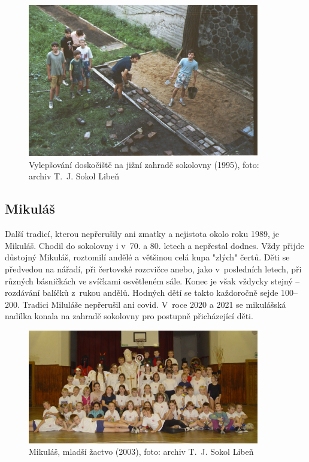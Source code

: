 \documentclass[a5paper, 11pt, twoside]{article}
\begin{document}
\begin{figure}[h!]
  \centering 
  \includegraphics[width=0.9\textwidth]{img/40_doskociste.jpg}
  \caption*{Vylepšování doskočiště na jižní zahradě sokolovny (1995), foto: archiv T.~J. Sokol Libeň}
\end{figure}


\subsection{Mikuláš}

Další tradicí, kterou nepřerušily ani zmatky a nejistota okolo roku
1989, je Mikuláš. Chodil do sokolovny i v~70. a 80. letech a nepřestal
dodnes. Vždy přijde důstojný Mikuláš, roztomilí andělé a většinou celá
kupa "zlých" čertů. Děti se předvedou na nářadí, při čertovské
rozcvičce anebo, jako v~posledních letech, při různých básničkách ve
svíčkami osvětleném sále. Konec je však vždycky stejný -- rozdávání
balíčků z~rukou andělů. Hodných dětí se takto každoročně sejde 100--200.
Tradici Miluláše nepřerušil ani covid. V~roce 2020 a 2021 se mikulášská
nadílka konala na zahradě sokolovny pro postupně přicházející děti.

\begin{figure}[h!]
  \centering 
  \includegraphics[width=0.9\textwidth]{img/41_mikulas.JPG}
  \caption*{Mikuláš, mladší žactvo (2003), foto: archiv T.~J. Sokol Libeň}
\end{figure}
\end{document}
